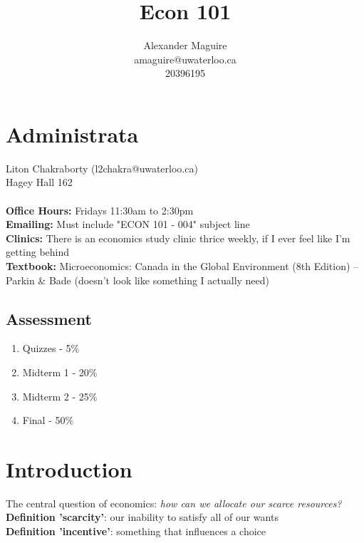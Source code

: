 \documentclass[12pt]{article}
\begin{document}
\renewcommand{\b}[1]{\textbf{#1}}
\newcommand{\insight}[1]{\b{Insight:} \textit{#1}}
\newcommand{\actionable}[1]{\todo{#1}}
\newcommand{\defn}[2]{\\ \b{Definition '#1'}: #2}


\nocite{*}

\title{Econ 101}

\author{Alexander Maguire \\
amaguire@uwaterloo.ca \\
20396195}

\maketitle

\section{Administrata}
Liton Chakraborty (l2chakra@uwaterloo.ca) \\
Hagey Hall 162 \\
\\
\b{Office Hours:} Fridays 11:30am to 2:30pm \\
\b{Emailing:} Must include "ECON 101 - 004" subject line \\
\b{Clinics:}  There is an economics study clinic thrice weekly, if I ever feel like I'm getting behind \\
\b{Textbook:} Microeconomics: Canada in the Global Environment (8th Edition) -- Parkin \& Bade (doesn't look like
something I actually need)


\subsection{Assessment}
\begin{enumerate}
    \item Quizzes - 5\%
    \item Midterm 1 - 20\%
    \item Midterm 2 - 25\%
    \item Final - 50\%
\end{enumerate}


\section{Introduction}
The central question of economics: \textit{how can we allocate our scarce resources?}
\defn{scarcity}{our inability to satisfy all of our wants}
\defn{incentive}{something that influences a choice}
\end{document}
